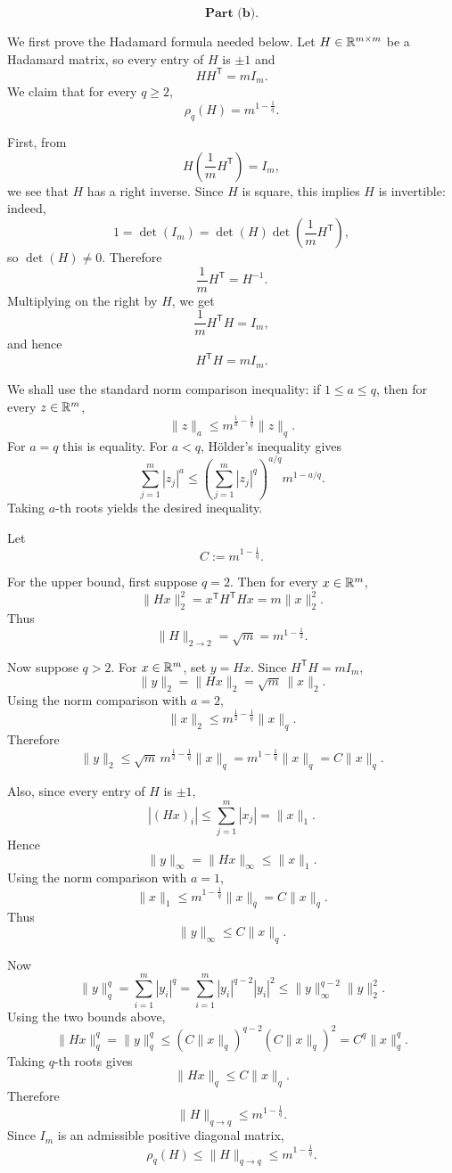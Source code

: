 \[
\textbf{Part (b).}
\]

We first prove the Hadamard formula needed below. Let \(H\in\mathbb{R}^{m\times m}\) be a Hadamard matrix, so every entry of \(H\) is \(\pm 1\) and
\[
HH^{\mathsf T}=mI_m.
\]
We claim that for every \(q\ge 2\),
\[
\rho_q(H)=m^{1-\frac1q}.
\]

First, from
\[
H\left(\frac1m H^{\mathsf T}\right)=I_m,
\]
we see that \(H\) has a right inverse. Since \(H\) is square, this implies \(H\) is invertible: indeed,
\[
1=\det(I_m)=\det(H)\det\left(\frac1mH^{\mathsf T}\right),
\]
so \(\det(H)\ne 0\). Therefore
\[
\frac1m H^{\mathsf T}=H^{-1}.
\]
Multiplying on the right by \(H\), we get
\[
\frac1m H^{\mathsf T}H=I_m,
\]
and hence
\[
H^{\mathsf T}H=mI_m.
\]

We shall use the standard norm comparison inequality: if \(1\le a\le q\), then for every \(z\in\mathbb{R}^m\),
\[
\|z\|_a\le m^{\frac1a-\frac1q}\|z\|_q.
\]
For \(a=q\) this is equality. For \(a<q\), Hölder's inequality gives
\[
\sum_{j=1}^m |z_j|^a
\le
\left(\sum_{j=1}^m |z_j|^q\right)^{a/q}
m^{1-a/q}.
\]
Taking \(a\)-th roots yields the desired inequality.

Let
\[
C:=m^{1-\frac1q}.
\]

For the upper bound, first suppose \(q=2\). Then for every \(x\in\mathbb{R}^m\),
\[
\|Hx\|_2^2
=
x^{\mathsf T}H^{\mathsf T}Hx
=
m\|x\|_2^2.
\]
Thus
\[
\|H\|_{2\to 2}=\sqrt m=m^{1-\frac12}.
\]

Now suppose \(q>2\). For \(x\in\mathbb{R}^m\), set \(y=Hx\). Since \(H^{\mathsf T}H=mI_m\),
\[
\|y\|_2=\|Hx\|_2=\sqrt m\,\|x\|_2.
\]
Using the norm comparison with \(a=2\),
\[
\|x\|_2\le m^{\frac12-\frac1q}\|x\|_q.
\]
Therefore
\[
\|y\|_2
\le
\sqrt m\,m^{\frac12-\frac1q}\|x\|_q
=
m^{1-\frac1q}\|x\|_q
=
C\|x\|_q.
\]

Also, since every entry of \(H\) is \(\pm1\),
\[
|(Hx)_i|
\le
\sum_{j=1}^m |x_j|
=
\|x\|_1.
\]
Hence
\[
\|y\|_\infty=\|Hx\|_\infty\le \|x\|_1.
\]
Using the norm comparison with \(a=1\),
\[
\|x\|_1\le m^{1-\frac1q}\|x\|_q=C\|x\|_q.
\]
Thus
\[
\|y\|_\infty\le C\|x\|_q.
\]

Now
\[
\|y\|_q^q
=
\sum_{i=1}^m |y_i|^q
=
\sum_{i=1}^m |y_i|^{q-2}|y_i|^2
\le
\|y\|_\infty^{q-2}\|y\|_2^2.
\]
Using the two bounds above,
\[
\|Hx\|_q^q
=
\|y\|_q^q
\le
(C\|x\|_q)^{q-2}(C\|x\|_q)^2
=
C^q\|x\|_q^q.
\]
Taking \(q\)-th roots gives
\[
\|Hx\|_q\le C\|x\|_q.
\]
Therefore
\[
\|H\|_{q\to q}\le m^{1-\frac1q}.
\]
Since \(I_m\) is an admissible positive diagonal matrix,
\[
\rho_q(H)\le \|H\|_{q\to q}\le m^{1-\frac1q}.
\]

